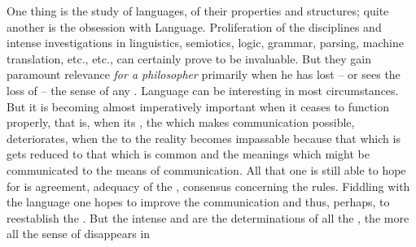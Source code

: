 \pa
One thing is the study of languages, of their properties and structures; quite
another is the obsession with Language. Proliferation of the disciplines and intense
investigations in linguistics, semiotics, logic, grammar, parsing, machine
translation, etc., etc., can certainly prove to be invaluable. But they gain paramount
relevance {\em for a philosopher} primarily when he has lost -- or sees the loss
of -- 
the sense of any . Language 
can be interesting in most circumstances. But it is becoming almost
imperatively important when it ceases to function properly, that is, when its
, the  which makes communication possible,
deteriorates, when the  to the  reality becomes
impassable because that which is  gets reduced to that which is
common and the  meanings which might be communicated to the
 means of communication.  All that one is still able to hope for is
 agreement, adequacy of the , consensus concerning the rules.
Fiddling with the language one hopes to improve the 
communication and thus, perhaps, to reestablish the . But the 
intense and  are the determinations of all the 
  , the more all the sense of  disappears in
